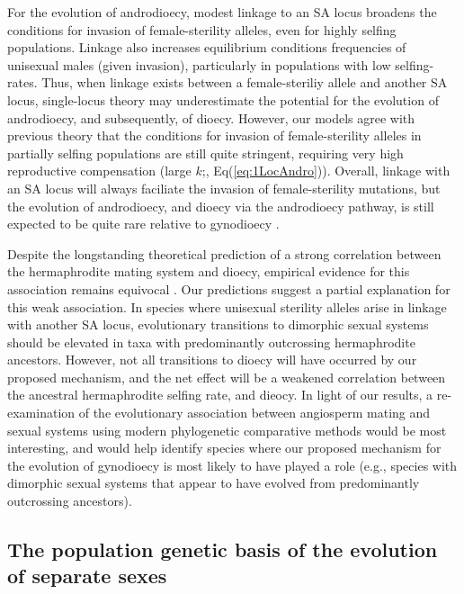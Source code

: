 \documentclass[9pt,twocolumn,twoside,lineno]{gsajnl}
\begin{document}
For the evolution of androdioecy, modest linkage to an SA locus broadens the conditions for invasion of female-sterility alleles, even for highly selfing populations. Linkage also increases equilibrium conditions frequencies of unisexual males (given invasion), particularly in populations with low selfing-rates. Thus, when linkage exists between a female-steriliy allele and another SA locus, single-locus theory may underestimate the potential for the evolution of androdioecy, and subsequently, of dioecy. However, our models agree with previous theory that the conditions for invasion of female-sterility alleles in partially selfing populations are still quite stringent, requiring very high reproductive compensation (large $k$;\citealt{Charlesworth1978a}, Eq(\ref{eq:1LocAndro})). Overall, linkage with an SA locus will always faciliate the invasion of female-sterility mutations, but the evolution of androdioecy, and dioecy via the androdioecy pathway, is still expected to be quite rare relative to gynodioecy \citep{Charlesworth1978a,Charlesworth2006,KaferPannell2017,Renner2014}.

Despite the longstanding theoretical prediction of a strong correlation between the hermaphrodite mating system and dioecy, empirical evidence for this association remains equivocal \citep{Charlesworth1985,Charlesworth2006,Renner2014}. Our predictions suggest a partial explanation for this weak association. In species where unisexual sterility alleles arise in linkage with another SA locus, evolutionary transitions to dimorphic sexual systems should be elevated in taxa with predominantly outcrossing hermaphrodite ancestors. However, not all transitions to dioecy will have occurred by our proposed mechanism, and the net effect will be a weakened correlation between the ancestral hermaphrodite selfing rate, and dieocy. In light of our results, a re-examination of the evolutionary association between angiosperm mating and sexual systems using modern phylogenetic comparative methods would be most interesting, and would help identify species where our proposed mechanism for the evolution of gynodioecy is most likely to have played a role (e.g., species with dimorphic sexual systems that appear to have evolved from predominantly outcrossing ancestors). 


\subsection{The population genetic basis of the evolution of separate sexes}
\end{document}
